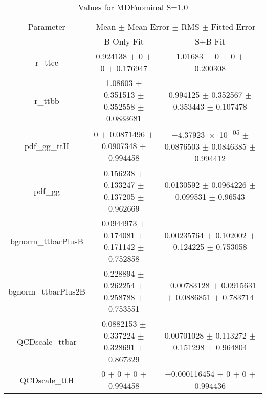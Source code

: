 \begin{table}
\centering
\caption{Values for MDFnominal S=1.0}
\begin{tabular}{ccc}
\toprule
Parameter & \multicolumn{2}{c}{Mean $\pm$ Mean Error $\pm$ RMS $\pm$ Fitted Error}\\
 & B-Only Fit & S+B Fit\\
\midrule
r\_ttcc & \num{0.924138} $\pm$ \num{0} $\pm$ \num{0} $\pm$ \num{0.176947} & \num{1.01683} $\pm$ \num{0} $\pm$ \num{0} $\pm$ \num{0.200308}\\
r\_ttbb & \num{1.08603} $\pm$ \num{0.351513} $\pm$ \num{0.352558} $\pm$ \num{0.0833681} & \num{0.994125} $\pm$ \num{0.352567} $\pm$ \num{0.353443} $\pm$ \num{0.107478}\\
pdf\_gg\_ttH & \num{0} $\pm$ \num{0.0871496} $\pm$ \num{0.0907348} $\pm$ \num{0.994458} & \num{-4.37923e-05} $\pm$ \num{0.0876503} $\pm$ \num{0.0846385} $\pm$ \num{0.994412}\\
pdf\_gg & \num{0.156238} $\pm$ \num{0.133247} $\pm$ \num{0.137205} $\pm$ \num{0.962669} & \num{0.0130592} $\pm$ \num{0.0964226} $\pm$ \num{0.099531} $\pm$ \num{0.96543}\\
bgnorm\_ttbarPlusB & \num{0.0944973} $\pm$ \num{0.174081} $\pm$ \num{0.171142} $\pm$ \num{0.752858} & \num{0.00235764} $\pm$ \num{0.102002} $\pm$ \num{0.124225} $\pm$ \num{0.753058}\\
bgnorm\_ttbarPlus2B & \num{0.228894} $\pm$ \num{0.262254} $\pm$ \num{0.258788} $\pm$ \num{0.753551} & \num{-0.00783128} $\pm$ \num{0.0915631} $\pm$ \num{0.0886851} $\pm$ \num{0.783714}\\
QCDscale\_ttbar & \num{0.0882153} $\pm$ \num{0.337224} $\pm$ \num{0.328691} $\pm$ \num{0.867329} & \num{0.00701028} $\pm$ \num{0.113272} $\pm$ \num{0.151298} $\pm$ \num{0.964804}\\
QCDscale\_ttH & \num{0} $\pm$ \num{0} $\pm$ \num{0} $\pm$ \num{0.994458} & \num{-0.000116454} $\pm$ \num{0} $\pm$ \num{0} $\pm$ \num{0.994436}\\
\bottomrule
\end{tabular}
\end{table}